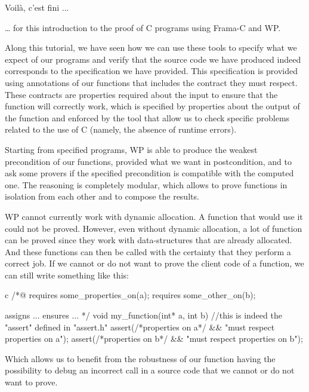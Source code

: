 \begin{Quotation}
Voilà, c'est fini ...
\end{Quotation}



\ldots{} for this introduction to the proof of C programs using Frama-C
and WP.

Along this tutorial, we have seen how we can use these tools to specify
what we expect of our programs and verify that the source code we have
produced indeed corresponds to the specification we have provided. This
specification is provided using annotations of our functions that
includes the contract they must respect. These contracts are properties
required about the input to ensure that the function will correctly
work, which is specified by properties about the output of the function
and enforced by the tool that allow us to check specific problems related
to the use of C (namely, the absence of runtime errors).

Starting from specified programs, WP is able to produce the weakest
precondition of our functions, provided what we want in postcondition,
and to ask some provers if the specified precondition is compatible with
the computed one. The reasoning is completely modular, which allows to
prove functions in isolation from each other and to compose the results.


WP cannot currently work with dynamic allocation. A function that would use it
could not be proved. However, even without dynamic allocation, a lot of function
can be proved since they work with data-structures that are already allocated.
And these functions can then be called with the certainty that they
perform a correct job. If we cannot or do not want to prove the client code of a
function, we can still write something like this:



\begin{CodeBlock}{c}
/*@
  requires some_properties_on(a);
  requires some_other_on(b);

  assigns ...
  ensures ...
*/
void my_function(int* a, int b){
  //this is indeed the  "assert" defined in "assert.h"
  assert(/*properties on a*/ && "must respect properties on a");  
  assert(/*properties on b*/ && "must respect properties on b");
}
\end{CodeBlock}



Which allows us to benefit from the robustness of our function having
the possibility to debug an incorrect call in a source code that we
cannot or do not want to prove.

